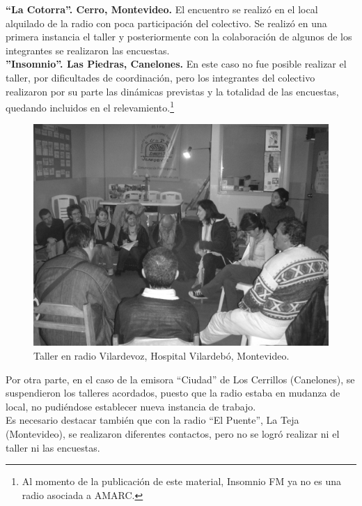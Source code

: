 \textbf{“La Cotorra”. Cerro, Montevideo.} El encuentro se realizó en el local alquilado de la radio con poca participación del colectivo. Se realizó en una primera instancia el taller y posteriormente con la colaboración de algunos de los integrantes se realizaron las encuestas.\\

\textbf{”Insomnio”. Las Piedras, Canelones.} En este caso no fue posible realizar el taller, por dificultades de coordinación, pero los integrantes del colectivo realizaron por su parte las dinámicas previstas y la totalidad de las encuestas, quedando incluidos en el relevamiento.\footnote{Al momento de la publicación de este material, Insomnio FM ya no es una radio asociada a AMARC.}\\
\begin{figure}[htbp!]
 \centering
 \includegraphics[scale=0.1,keepaspectratio=true]{./Cap/Fotos/Vilarbyn.jpg}
 \caption{Taller en radio Vilardevoz, Hospital Vilardebó, Montevideo.}
 \label{Vilarbyn}
\end{figure}

Por otra parte, en el caso de la emisora “Ciudad” de Los Cerrillos (Canelones), se suspendieron los talleres acordados, puesto que la radio estaba en mudanza de local, no pudiéndose establecer nueva instancia de trabajo.\\

Es necesario destacar también que con la radio “El Puente”, La Teja (Montevideo), se realizaron diferentes contactos, pero no se logró realizar ni el taller ni las encuestas.\\

